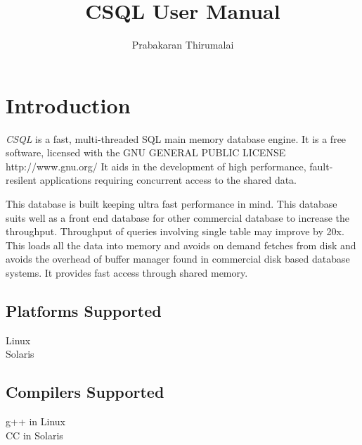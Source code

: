 \documentclass[12pt]{article}
\begin{document}
         

\title{CSQL User Manual } 
\author{Prabakaran Thirumalai } 
\date{} 
\maketitle 
\pagebreak
\tableofcontents
\pagebreak
\section{Introduction}
\label{Introduction}

\emph {CSQL} is a fast, multi-threaded SQL main memory database engine. It is a free software, licensed with the GNU GENERAL PUBLIC LICENSE http://www.gnu.org/
It aids in the development of high performance, fault-resilent applications requiring concurrent access to the shared data. 

This database is built keeping ultra fast performance in mind. This database suits well as a front end database for other commercial database to increase the throughput. Throughput of queries involving single table may improve by 20x. This loads all the data into memory and avoids on demand fetches from disk and avoids the overhead of buffer manager found in commercial disk based database systems. It provides fast access through shared memory.

\subsection{Platforms Supported}
\label{psupported}
Linux \\
Solaris 

\subsection{Compilers Supported}
\label{csupported}
g++ in Linux \\
CC in Solaris
\end{document}
